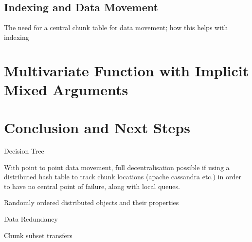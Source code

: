 \documentclass[a4paper,10pt]{article}
\begin{document}
\subsection{Indexing and Data Movement}

The need for a central chunk table for data movement; how this helps with indexing

\section{Multivariate Function with Implicit Mixed Arguments}

\section{Conclusion and Next Steps}

Decision Tree

With point to point data movement, full decentralisation possible if using a
distributed hash table to track chunk locations (apache cassandra etc.) in
order to have no central point of failure, along with local queues.

Randomly ordered distributed objects and their properties

Data Redundancy

Chunk subset transfers
\end{document}
